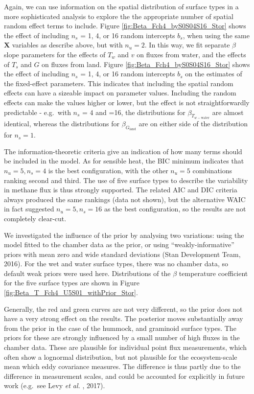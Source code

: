Again, we can use information on the spatial distribution of surface
types in a more sophisticated analysis to explore the the appropriate
number of spatial random effect terms to include. Figure
\ref{fig:Beta_Fch4_byS0S04S16_Stor} shows the effect of including
\(n_s\) = 1, 4, or 16 random intercepts \(b_s\), when using the same
\(\mathbf{X}\) variables as describe above, but with \(n_u = 2\). In
this way, we fit separate \(\beta\) slope parameters for the effects of
\(T_w\) and \(v\) on fluxes from water, and the effects of \(T_s\) and
\(G\) on fluxes from land. Figure \ref{fig:Beta_Fch4_byS0S04S16_Stor}
shows the effect of including \(n_s\) = 1, 4, or 16 random intercepts
\(b_s\) on the estimates of the fixed-effect parameters. This indicates
that including the spatial random effects can have a sizeable impact on
parameter values. Including the random effects can make the values
higher or lower, but the effect is not straightforwardly predictable -
e.g.~with \(n_s\) = 4 and =16, the distributions for
\(\beta_{T_{w-\mathrm{water}}}\) are almost identical, whereas the
distributions for \(\beta_{G_{\mathrm{land}}}\) are on either side of
the distribution for \(n_s = 1\).

The information-theoretic criteria give an indication of how many terms
should be included in the model. As for sensible heat, the BIC minimum
indicates that \(n_u = 5, n_s = 4\) is the best configuration, with the
other \(n_u = 5\) combinations ranking second and third. The use of five
surface types to describe the variability in methane flux is thus
strongly supported. The related AIC and DIC criteria always produced the
same rankings (data not shown), but the alternative WAIC in fact
suggested \(n_u = 5, n_s = 16\) as the best configuration, so the
results are not completely clear-cut.

We investigated the influence of the prior by analysing two variations:
using the model fitted to the chamber data as the prior, or using
``weakly-informative'' priors with mean zero and wide standard
deviations (Stan Development Team, 2016). For the wet and water surface
types, there was no chamber data, so default weak priors were used here.
Distributions of the \(\beta\) temperature coefficient for the five
surface types are shown in Figure
\ref{fig:Beta_T_Fch4_U5S01_withPrior_Stor}.

Generally, the red and green curves are not very different, so the prior
does not have a very strong effect on the results. The posterior moves
substantially away from the prior in the case of the hummock, and
graminoid surface types. The priors for these are strongly influenced by
a small number of high fluxes in the chamber data. These are plausible
for individual point flux measurements, which often show a lognormal
distribution, but not plausible for the ecosystem-scale mean which eddy
covariance measures. The difference is thus partly due to the difference
in measurement scales, and could be accounted for explicitly in future
work (e.g.~see Levy \emph{et al.} , 2017).

